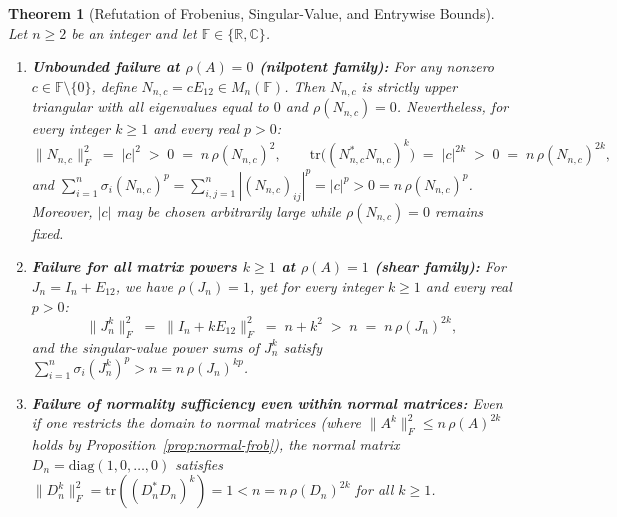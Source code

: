 \documentclass[11pt,a4paper]{article}
\theoremstyle{plain}
\newtheorem{theorem}{Theorem}[section]
\theoremstyle{definition}
\newcommand{\C}{\mathbb{C}}
\newcommand{\R}{\mathbb{R}}
\newcommand{\tr}{\mathrm{tr}}
\newcommand{\diag}{\mathrm{diag}}
\begin{document}
\begin{theorem}[Refutation of Frobenius, Singular-Value, and Entrywise Bounds]\label{thm:refute-reading2}
Let $n \ge 2$ be an integer and let $\mathbb{F} \in \{\R, \C\}$.
\begin{enumerate}
  \item[(a)] \textbf{Unbounded failure at $\rho(A) = 0$ (nilpotent family):} For any nonzero $c \in \mathbb{F} \setminus \{0\}$, define $N_{n,c} = c E_{12} \in M_n(\mathbb{F})$. Then $N_{n,c}$ is strictly upper triangular with all eigenvalues equal to $0$ and $\rho(N_{n,c}) = 0$. Nevertheless, for every integer $k \ge 1$ and every real $p > 0$:
  \[
    \|N_{n,c}\|_F^2 \;=\; |c|^2 \;>\; 0 \;=\; n\,\rho(N_{n,c})^2, \qquad
    \tr\bigl((N_{n,c}^* N_{n,c})^k\bigr) \;=\; |c|^{2k} \;>\; 0 \;=\; n\,\rho(N_{n,c})^{2k},
  \]
  and $\sum_{i=1}^n \sigma_i(N_{n,c})^p = \sum_{i,j=1}^n |(N_{n,c})_{ij}|^p = |c|^p > 0 = n\,\rho(N_{n,c})^p$. Moreover, $|c|$ may be chosen arbitrarily large while $\rho(N_{n,c}) = 0$ remains fixed.
  \item[(b)] \textbf{Failure for all matrix powers $k \ge 1$ at $\rho(A) = 1$ (shear family):} For $J_n = I_n + E_{12}$, we have $\rho(J_n) = 1$, yet for \emph{every} integer $k \ge 1$ and \emph{every} real $p > 0$:
  \[
    \|J_n^k\|_F^2 \;=\; \|I_n + k E_{12}\|_F^2 \;=\; n + k^2 \;>\; n \;=\; n\,\rho(J_n)^{2k},
  \]
  and the singular-value power sums of $J_n^k$ satisfy $\sum_{i=1}^n \sigma_i(J_n^k)^p > n = n\,\rho(J_n)^{kp}$.
  \item[(c)] \textbf{Failure of normality sufficiency even within normal matrices:} Even if one restricts the domain to normal matrices (where $\|A^k\|_F^2 \le n\,\rho(A)^{2k}$ holds by Proposition~\ref{prop:normal-frob}), the normal matrix $D_n = \diag(1,0,\dots,0)$ satisfies $\|D_n^k\|_F^2 = \tr((D_n^* D_n)^k) = 1 < n = n\,\rho(D_n)^{2k}$ for all $k \ge 1$.
\end{enumerate}
\end{theorem}
\end{document}
